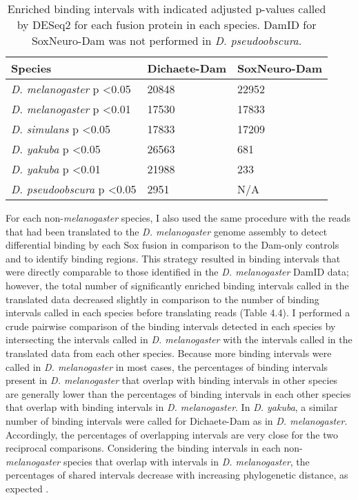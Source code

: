 \begin{table}[h]
\centering
\begin{tabular}{|l|l|l|}
\hline
\textbf{Species}                           & \textbf{Dichaete-Dam} & \textbf{SoxNeuro-Dam} \\ \hline
\emph{D. melanogaster} p \textless 0.05  & 20848        & 22952        \\ \hline
\emph{D. melanogaster} p \textless 0.01  & 17530        & 17833        \\ \hline
\emph{D. simulans} p \textless 0.05      & 17833        & 17209        \\ \hline
\emph{D. yakuba} p \textless 0.05        & 26563        & 681          \\ \hline
\emph{D. yakuba} p \textless 0.01        & 21988        & 233          \\ \hline
\emph{D. pseudoobscura} p \textless 0.05 & 2951         & N/A          \\ \hline
\end{tabular}
\caption{Enriched binding intervals with indicated adjusted p-values called by DESeq2 for each fusion protein in each species. DamID for SoxNeuro-Dam was not performed in \emph{D. pseudoobscura}.}
\label{Table 4.3}
\end{table}

For each non-\emph{melanogaster} species, I also used the same procedure with the reads that had been translated to the \emph{D. melanogaster} genome assembly to detect differential binding by each Sox fusion in comparison to the Dam-only controls and to identify binding regions. This strategy resulted in binding intervals that were directly comparable to those identified in the \emph{D. melanogaster} DamID data; however, the total number of significantly enriched binding intervals called in the translated data decreased slightly in comparison to the number of binding intervals called in each species before translating reads (Table 4.4). I performed a crude pairwise comparison of the binding intervals detected in each species by intersecting the intervals called in \emph{D. melanogaster} with the intervals called in the translated data from each other species. Because more binding intervals were called in \emph{D. melanogaster} in most cases, the percentages of binding intervals present in \emph{D. melanogaster} that overlap with binding intervals in other species are generally lower than the percentages of binding intervals in each other species that overlap with binding intervals in \emph{D. melanogaster}. In \emph{D. yakuba}, a similar number of binding intervals were called for Dichaete-Dam as in \emph{D. melanogaster}. Accordingly, the percentages of overlapping intervals are very close for the two reciprocal comparisons. Considering the binding intervals in each non-\emph{melanogaster} species that overlap with intervals in \emph{D. melanogaster}, the percentages of shared intervals decrease with increasing phylogenetic distance, as expected \citep{he_high_2011,paris_extensive_2013}.\\

